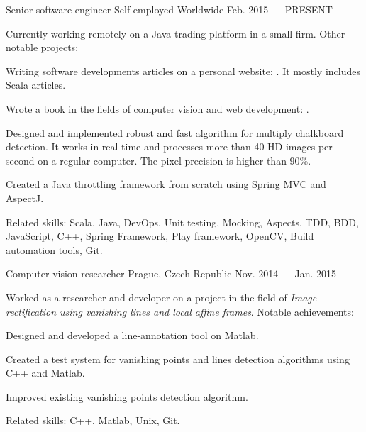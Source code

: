 

\begin{cventries}

  \cventry
    {Senior software engineer} %
    {Self-employed} %
    {Worldwide} %
    {Feb. 2015 --- PRESENT} %
    {    
    Currently working remotely on a Java trading platform in a small firm. Other notable projects:
      \begin{cvitems}
      \item{Writing software developments articles on a personal website: . It mostly includes Scala articles.}
      \item{Wrote a book in the fields of computer vision and web development: .}
      \item{Designed and implemented robust and fast algorithm for multiply chalkboard detection. It works in real-time and processes more than 40 HD images per second on a regular computer. The pixel precision is higher than 90\%.}
      \item{Created a Java throttling framework from scratch using Spring MVC and AspectJ.}
      \end{cvitems}
      Related skills: Scala, Java, DevOps, Unit testing, Mocking, Aspects, TDD, BDD, JavaScript, C++, Spring Framework, Play framework, OpenCV, Build automation tools, Git.
    }
    
  \cventry
    {Computer vision researcher} %
    {} %
    {Prague, Czech Republic} %
    {Nov. 2014 --- Jan. 2015} %
    {
	Worked as a researcher and developer on a project in the field of \textit{Image rectification using vanishing lines and local affine frames}. Notable achievements:
      \begin{cvitems}
      \item{Designed and developed a line-annotation tool on Matlab.}
      \item{Created a test system for vanishing points and lines detection algorithms using C++ and Matlab.}
      \item{Improved existing vanishing points detection algorithm.}
      \end{cvitems}
      Related skills: C++, Matlab, Unix, Git.
    }
    

\end{cventries}
